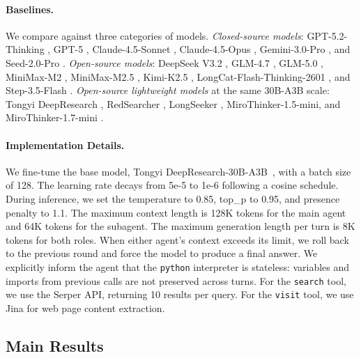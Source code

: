 \documentclass[table]{gtech}
\begin{document}
\paragraph{Baselines.}
We compare against three categories of models. \textit{Closed-source models}: GPT-5.2-Thinking \citep{openai2025gpt52}, GPT-5 \citep{openai2025gpt5}, Claude-4.5-Sonnet \citep{anthropic2025sonnet45}, Claude-4.5-Opus \citep{anthropic2025opus45}, Gemini-3.0-Pro \citep{google2025gemini3}, and Seed-2.0-Pro \citep{bytedance2026seed2}. \textit{Open-source models}: DeepSeek V3.2 \citep{liu2025deepseek}, GLM-4.7 \citep{glm2025glm47}, GLM-5.0 \citep{zeng2026glm}, MiniMax-M2 \citep{minimax2025m2}, MiniMax-M2.5 \citep{minimax2026m25}, Kimi-K2.5 \citep{team2026kimi}, LongCat-Flash-Thinking-2601 \citep{team2026longcat}, and Step-3.5-Flash \citep{huang2026step}. \textit{Open-source lightweight models} at the same 30B-A3B scale: Tongyi DeepResearch \citep{team2025tongyi}, RedSearcher \citep{chu2026redsearcher}, LongSeeker \citep{lu2026longseeker}, MiroThinker-1.5-mini, and MiroThinker-1.7-mini \citep{team2026mirothinker}.

\paragraph{Implementation Details.}
We fine-tune the base model, Tongyi DeepResearch-30B-A3B~\citep{team2025tongyi}, with a batch size of 128. The learning rate decays from 5e-5 to 1e-6 following a cosine schedule. During inference, we set the temperature to 0.85, top\_p to 0.95, and presence penalty to 1.1. The maximum context length is 128K tokens for the main agent and 64K tokens for the subagent. The maximum generation length per turn is 8K tokens for both roles. When either agent's context exceeds its limit, we roll back to the previous round and force the model to produce a final answer. We explicitly inform the agent that the \texttt{python} interpreter is stateless: variables and imports from previous calls are not preserved across turns. For the \texttt{search} tool, we use the Serper API, returning 10 results per query. For the \texttt{visit} tool, we use Jina for web page content extraction.

\subsection{Main Results}
\end{document}
